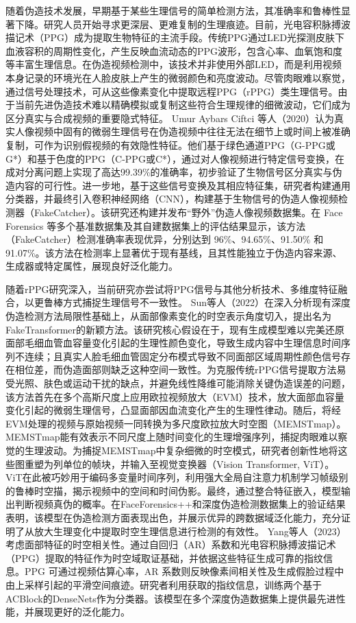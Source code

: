 \documentclass[conference]{IEEEtran}
\begin{document}
随着伪造技术发展，早期基于某些生理信号的简单检测方法，其准确率和鲁棒性显著下降。研究人员开始寻求更深层、更难复制的生理痕迹。目前，光电容积脉搏波描记术（PPG）成为提取生物特征的主流手段。传统PPG通过LED光探测皮肤下血液容积的周期性变化，产生反映血流动态的PPG波形，包含心率、血氧饱和度等丰富生理信息。在伪造视频检测中，该技术并非使用外部LED，而是利用视频本身记录的环境光在人脸皮肤上产生的微弱颜色和亮度波动。尽管肉眼难以察觉，通过信号处理技术，可从这些像素变化中提取远程PPG（rPPG\cite{Ming-ZherPoh-425}）类生理信号。由于当前先进伪造技术难以精确模拟或复制这些符合生理规律的细微波动，它们成为区分真实与合成视频的重要隐式特征。
Umur Aybars Ciftci 等人（2020）认为真实人像视频中固有的微弱生理信号在伪造视频中往往无法在细节上或时间上被准确复制，可作为识别假视频的有效隐性特征。他们基于绿色通道PPG（G-PPG或G*）和基于色度的PPG（C-PPG或C*），通过对人像视频进行特定信号变换，在成对分离问题上实现了高达99.39\%的准确率，初步验证了生物信号区分真实与伪造内容的可行性。进一步地，基于这些信号变换及其相应特征集，研究者构建通用分类器，并最终引入卷积神经网络（CNN），构建基于生物信号的伪造人像视频检测器（FakeCatcher）。该研究还构建并发布“野外”伪造人像视频数据集。在 Face Forensics 等多个基准数据集及其自建数据集上的评估结果显示，该方法（FakeCatcher）检测准确率表现优异，分别达到 96\%、94.65\%、91.50\% 和 91.07\%。该方法在检测率上显著优于现有基线，且其性能独立于伪造内容来源、生成器或特定属性，展现良好泛化能力\cite{CiftciDemir-93}。

随着rPPG研究深入，当前研究亦尝试将PPG信号与其他分析技术、多维度特征融合，以更鲁棒方式捕捉生理信号不一致性。
Sun等人（2022）在深入分析现有深度伪造检测方法局限性基础上，从面部像素变化的时空表示角度切入，提出名为FakeTransformer的新颖方法。该研究核心假设在于，现有生成模型难以完美还原面部毛细血管血容量变化引起的生理性颜色变化，导致生成内容中生理信息时间序列不连续；且真实人脸毛细血管固定分布模式导致不同面部区域周期性颜色信号存在相位差，而伪造面部则缺乏这种空间一致性。为克服传统rPPG信号提取方法易受光照、肤色或运动干扰的缺点，并避免线性降维可能消除关键伪造误差的问题，该方法首先在多个高斯尺度上应用欧拉视频放大（EVM）技术，放大面部血容量变化引起的微弱生理信号，凸显面部因血流变化产生的生理性律动。随后，将经EVM处理的视频与原始视频一同转换为多尺度欧拉放大时空图（MEMSTmap）。MEMSTmap能有效表示不同尺度上随时间变化的生理增强序列，捕捉肉眼难以察觉的生理波动。为捕捉MEMSTmap中复杂细微的时空模式，研究者创新性地将这些图重塑为列单位的帧块，并输入至视觉变换器（Vision Transformer, ViT）。ViT在此被巧妙用于编码多变量时间序列，利用强大全局自注意力机制学习帧级别的鲁棒时空描，揭示视频中的空间和时间伪影。最终，通过整合特征嵌入，模型输出判断视频真伪的概率。在FaceForensics++和深度伪造检测数据集上的验证结果表明，该模型在伪造检测方面表现出色，并展示优异的跨数据域泛化能力，充分证明了从放大生理变化中提取时空生理信息进行检测的有效性\cite{Y.Z.-402}。
Yang等人（2023）考虑面部特征的时空相关性。通过自回归（AR）系数和光电容积脉搏波描记术（PPG）提取的特征作为时空域取证基础，并依据这些特征生成可靠的指纹信息。PPG 可通过视频估算心率，AR 系数则反映像素间相关性及生成假脸过程中由上采样引起的平滑空间痕迹。研究者利用获取的指纹信息，训练两个基于ACBlock的DenseNets作为分类器。该模型在多个深度伪造数据集上提供最先进性能，并展现更好的泛化能力\cite{JY-412}。
\end{document}
